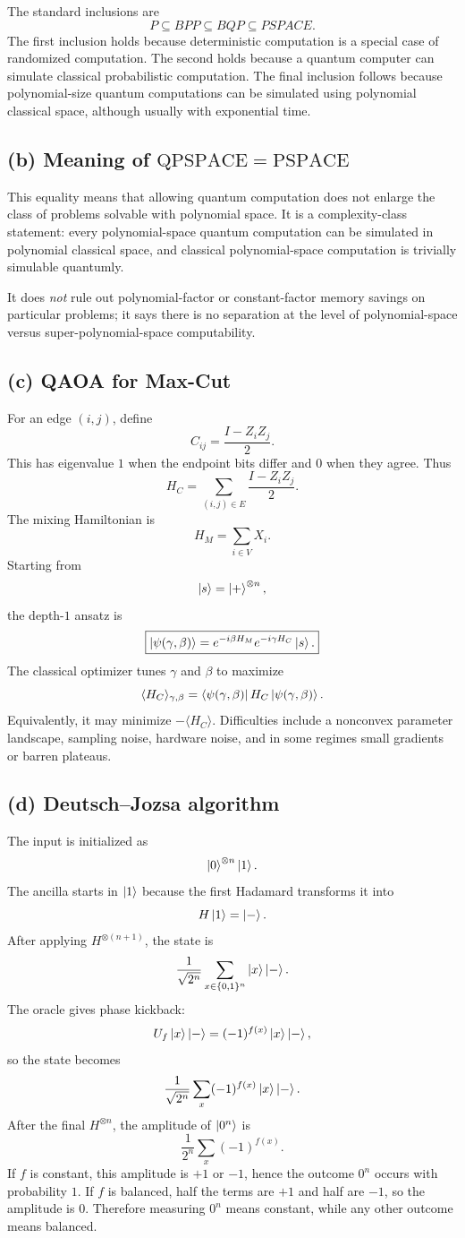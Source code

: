 \documentclass[11pt,a4paper]{article}
\begin{document}
The standard inclusions are
\[
P\subseteq BPP\subseteq BQP\subseteq PSPACE.
\]
The first inclusion holds because deterministic computation is a special case of
randomized computation. The second holds because a quantum computer can simulate
classical probabilistic computation. The final inclusion follows because polynomial-size
quantum computations can be simulated using polynomial classical space, although usually
with exponential time.

\subsection*{(b) Meaning of $\mathrm{QPSPACE}=\mathrm{PSPACE}$}
This equality means that allowing quantum computation does not enlarge the class of
problems solvable with polynomial space. It is a complexity-class statement: every
polynomial-space quantum computation can be simulated in polynomial classical space,
and classical polynomial-space computation is trivially simulable quantumly.

It does \emph{not} rule out polynomial-factor or constant-factor memory savings on
particular problems; it says there is no separation at the level of polynomial-space
versus super-polynomial-space computability.

\subsection*{(c) QAOA for Max-Cut}
For an edge $(i,j)$, define
\[
C_{ij}=\frac{I-Z_iZ_j}{2}.
\]
This has eigenvalue $1$ when the endpoint bits differ and $0$ when they agree. Thus
\[
H_C=\sum_{(i,j)\in E}\frac{I-Z_iZ_j}{2}.
\]
The mixing Hamiltonian is
\[
H_M=\sum_{i\in V}X_i.
\]
Starting from
\[
\ket{s}=\ket+^{\otimes n},
\]
the depth-$1$ ansatz is
\[
\boxed{
\ket{\psi(\gamma,\beta)}
=e^{-i\beta H_M}e^{-i\gamma H_C}\ket{s}.}
\]
The classical optimizer tunes $\gamma$ and $\beta$ to maximize
\[
\langle H_C\rangle_{\gamma,\beta}
=\bra{\psi(\gamma,\beta)}H_C\ket{\psi(\gamma,\beta)}.
\]
Equivalently, it may minimize $-\langle H_C\rangle$. Difficulties include a
nonconvex parameter landscape, sampling noise, hardware noise, and in some regimes
small gradients or barren plateaus.

\subsection*{(d) Deutsch--Jozsa algorithm}
The input is initialized as
\[
\ket0^{\otimes n}\ket1.
\]
The ancilla starts in $\ket1$ because the first Hadamard transforms it into
\[
H\ket1=\ket-.
\]
After applying $H^{\otimes(n+1)}$, the state is
\[
\frac1{\sqrt{2^n}}\sum_{x\in\{0,1\}^n}\ket{x}\ket-.
\]
The oracle gives phase kickback:
\[
U_f\ket{x}\ket-=(-1)^{f(x)}\ket{x}\ket-,
\]
so the state becomes
\[
\frac1{\sqrt{2^n}}\sum_x(-1)^{f(x)}\ket{x}\ket-.
\]
After the final $H^{\otimes n}$, the amplitude of $\ket{0^n}$ is
\[
\frac1{2^n}\sum_x(-1)^{f(x)}.
\]
If $f$ is constant, this amplitude is $+1$ or $-1$, hence the outcome $0^n$ occurs
with probability $1$. If $f$ is balanced, half the terms are $+1$ and half are $-1$,
so the amplitude is $0$. Therefore measuring $0^n$ means constant, while any other
outcome means balanced.
\end{document}
